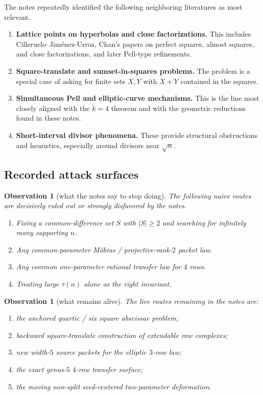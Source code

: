 \documentclass[11pt]{article}
\theoremstyle{plainbreak}
\theoremstyle{defbreak}
\newtheorem{observation}[theorem]{Observation}
\begin{document}
The notes repeatedly identified the following neighboring literatures as most relevant.
\begin{enumerate}[label=\textup{(\alph*)}]
    \item \textbf{Lattice points on hyperbolas and close factorizations.}  This includes Cilleruelo--Jim\'enez-Urroz, Chan's papers on perfect squares, almost squares, and close factorizations, and later Pell-type refinements.
    \item \textbf{Square-translate and sumset-in-squares problems.}  The problem is a special case of asking for finite sets $X,Y$ with $X+Y$ contained in the squares.
    \item \textbf{Simultaneous Pell and elliptic-curve mechanisms.}  This is the line most closely aligned with the $k=4$ theorem and with the geometric reductions found in these notes.
    \item \textbf{Short-interval divisor phenomena.}  These provide structural obstructions and heuristics, especially around divisors near $\sqrt n$.
\end{enumerate}

\subsection{Recorded attack surfaces}

\begin{observation}[what the notes say to stop doing]
The following naive routes are decisively ruled out or strongly disfavored by the notes.
\begin{enumerate}[label=\textup{(\roman*)}]
    \item Fixing a common-difference set $S$ with $|S|\ge 2$ and searching for infinitely many supporting $n$.
    \item Any common-parameter Möbius / projective-rank-$2$ packet law.
    \item Any common one-parameter rational transfer law for $4$ rows.
    \item Treating large $\tau(n)$ alone as the right invariant.
\end{enumerate}
\end{observation}

\begin{observation}[what remains alive]
The live routes remaining in the notes are:
\begin{enumerate}[label=\textup{(\roman*)}]
    \item the anchored quartic / six square abscissae problem;
    \item backward square-translate construction of extendable row complexes;
    \item new width-$5$ source packets for the elliptic $3$-row law;
    \item the exact genus-$5$ $4$-row transfer surface;
    \item the moving non-split seed-centered two-parameter deformation.
\end{enumerate}
\end{observation}
\end{document}
